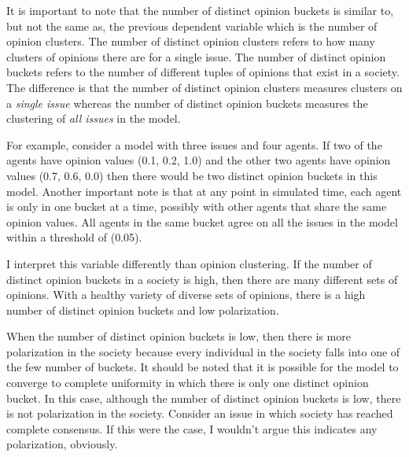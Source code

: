 It is important to note that the number of distinct opinion buckets is similar to, but not the same as, the previous dependent variable which is the number of opinion clusters. The number of distinct opinion clusters refers to how many clusters of opinions there are for a single issue. The number of distinct opinion buckets refers to the number of different tuples of opinions that exist in a society. The difference is that the number of distinct opinion clusters measures clusters on a \textit{single issue} whereas the number of distinct opinion buckets measures the clustering of \textit{all issues} in the model.

For example, consider a model with three issues and four agents. If two of the agents have opinion values (0.1, 0.2, 1.0) and the other two agents have opinion values (0.7, 0.6, 0.0) then there would be two distinct opinion buckets in this model. Another important note is that at any point in simulated time, each agent is only in one bucket at a time, possibly with other agents that share the same opinion values. All agents in the same bucket agree on all the issues in the model within a threshold of \epsilon (0.05). 
 
I interpret this variable differently than opinion clustering. If the number of distinct opinion buckets in a society is high, then there are many different sets of opinions. With a healthy variety of diverse sets of opinions, there is a high number of distinct opinion buckets and low polarization. 

When the number of distinct opinion buckets is low, then there is more polarization in the society because every individual in the society falls into one of the few number of buckets. It should be noted that it is possible for the model to converge to complete uniformity in which there is only one distinct opinion bucket. In this case, although the number of distinct opinion buckets is low, there is not polarization in the society. Consider an issue in which society has reached complete consensus. If this were the case, I wouldn't argue this indicates any polarization, obviously.    